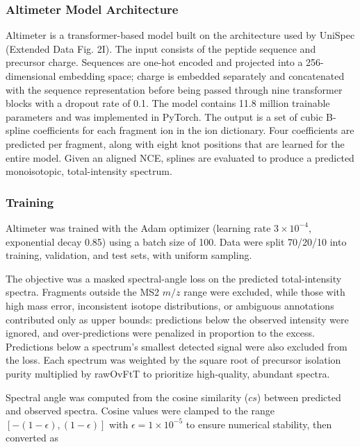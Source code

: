 \documentclass[pdflatex,sn-nature]{sn-jnl}
\begin{document}
\subsubsection{Altimeter Model Architecture}\label{subsubsec:altimeter-model-architecture}
Altimeter is a transformer-based model built on the architecture used by UniSpec \cite{Lapin2024-xj} (Extended Data Fig. 2I). The input consists of the peptide sequence and precursor charge. Sequences are one-hot encoded and projected into a 256-dimensional embedding space; charge is embedded separately and concatenated with the sequence representation before being passed through nine transformer blocks with a dropout rate of 0.1. The model contains 11.8 million trainable parameters and was implemented in PyTorch.
The output is a set of cubic B-spline coefficients for each fragment ion in the ion dictionary. Four coefficients are predicted per fragment, along with eight knot positions that are learned for the entire model. Given an aligned NCE, splines are evaluated to produce a predicted monoisotopic, total-intensity spectrum.

\subsubsection{Training}\label{subsubsec:altimeter-training}
Altimeter was trained with the Adam optimizer (learning rate $3\times10^{-4}$, exponential decay 0.85) using a batch size of 100. Data were split 70/20/10 into training, validation, and test sets, with uniform sampling.  

The objective was a masked spectral-angle loss on the predicted total-intensity spectra. Fragments outside the MS2 $m/z$ range were excluded, while those with high mass error, inconsistent isotope distributions, or ambiguous annotations contributed only as upper bounds: predictions below the observed intensity were ignored, and over-predictions were penalized in proportion to the excess. Predictions below a spectrum's smallest detected signal were also excluded from the loss. Each spectrum was weighted by the square root of precursor isolation purity multiplied by rawOvFtT to prioritize high-quality, abundant spectra.  

Spectral angle was computed from the cosine similarity ($cs$) between predicted and observed spectra. Cosine values were clamped to the range $[-(1-\epsilon), (1-\epsilon)]$ with $\epsilon = 1\times10^{-5}$ to ensure numerical stability, then converted as  
\end{document}
